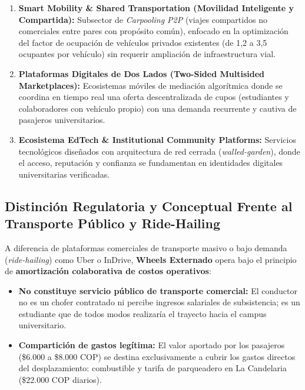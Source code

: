\documentclass[11pt,a4paper]{article}
\begin{document}
\begin{enumerate}[leftmargin=*]
    \item \textbf{Smart Mobility \& Shared Transportation (Movilidad Inteligente y Compartida):} Subsector de \textit{Carpooling P2P} (viajes compartidos no comerciales entre pares con propósito común), enfocado en la optimización del factor de ocupación de vehículos privados existentes (de 1,2 a 3,5 ocupantes por vehículo) sin requerir ampliación de infraestructura vial.
    \item \textbf{Plataformas Digitales de Dos Lados (Two-Sided Multisided Marketplaces):} Ecosistemas móviles de mediación algorítmica donde se coordina en tiempo real una oferta descentralizada de cupos (estudiantes y colaboradores con vehículo propio) con una demanda recurrente y cautiva de pasajeros universitarios.
    \item \textbf{Ecosistema EdTech \& Institutional Community Platforms:} Servicios tecnológicos diseñados con arquitectura de red cerrada (\textit{walled-garden}), donde el acceso, reputación y confianza se fundamentan en identidades digitales universitarias verificadas.
\end{enumerate}

\subsection{Distinción Regulatoria y Conceptual Frente al Transporte Público y Ride-Hailing}
A diferencia de plataformas comerciales de transporte masivo o bajo demanda (\textit{ride-hailing}) como Uber o InDrive, \textbf{Wheels Externado} opera bajo el principio de \textbf{amortización colaborativa de costos operativos}:
\begin{itemize}[leftmargin=*]
    \item \textbf{No constituye servicio público de transporte comercial:} El conductor no es un chofer contratado ni percibe ingresos salariales de subsistencia; es un estudiante que de todos modos realizaría el trayecto hacia el campus universitario.
    \item \textbf{Compartición de gastos legítima:} El valor aportado por los pasajeros (\$6.000 a \$8.000 COP) se destina exclusivamente a cubrir los gastos directos del desplazamiento: combustible y tarifa de parqueadero en La Candelaria (\$22.000 COP diarios).
\end{itemize}

\end{document}
